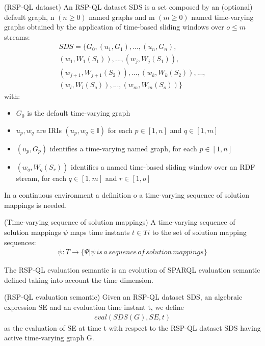 \begin{Definition}
(RSP-QL dataset) An RSP-QL dataset SDS is a set composed by an (optional) default graph, n $(n \geq 0)$ named graphs and m $(m \geq 0)$ named time-varying graphs obtained by the application of time-based sliding windows over $o \leq m$ streams:
\noindent\begin{align*}
SDS =\{G_0, (u_1,G_1), ..., (u_n,G_n),\\
(w_1, W_1(S_1)), ... , (w_j , W_j(S_1)), \\
(w_{j+1}, W_{j+1}(S_2)), ..., (w_k, W_k(S_2)), ..., \\ (w_l,W_l(S_o)), ..., (w_m, W_m(S_o))\}
\end{align*}  
with:
\begin{itemize}
\item $G_0$ is the default time-varying graph
\item $u_p,w_q$ are IRIs $(u_p,w_q \in \mathbb{I})$ for each $p \in [1,n]$ and $q \in [1,m]$
\item $(u_p,G_p)$ identifies a time-varying named
graph, for each $p \in [1, n]$
\item $(w_q , W_q (S_r))$ identifies a named time-based sliding window over an RDF stream, for each $q \in [1, m]$ and $r \in [1, o]$
\end{itemize}
\end{Definition}

In a continuous environment a definition o a time-varying sequence of solution mappings is needed.

\begin{Definition}
(Time-varying sequence of solution mappings)
A time-varying sequence of solution mappings $\psi$ maps time instants $t \in Ti$ to the set of solution mapping sequences:
\noindent\begin{align*}
\psi : T \rightarrow \{\Psi | \psi\, is\, a\, sequence\, of\, solution\, mappings\}
\end{align*}  
\end{Definition}

The RSP-QL evaluation semantic is an evolution of SPARQL evaluation semantic defined taking into account the time dimension.

\begin{Definition}
(RSP-QL evaluation semantic)
Given an RSP-QL dataset SDS, an algebraic expression SE and an evaluation time instant t, we define
\noindent\begin{align*}
eval(SDS(G), SE, t)
\end{align*}  
as the evaluation of SE at time t with respect to the RSP-QL dataset SDS having active time-varying graph G.
\end{Definition}

